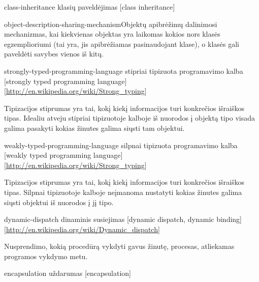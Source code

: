 \begin{glossary}
\begin{entry}
  \end{entry}

  \begin{entry}%
    {class-inheritance}%
    {klasių paveldėjimas}%
    [class inheritance]

    \gls{object-description-sharing-mechanism}{Objektų apibrėžimų
    dalinimosi mechanizmas}, kai kiekvienas objektas yra laikomas
    kokios nors klasės egzemplioriumi (tai yra, jis apibrėžiamas
    pasinaudojant klase), o klasės gali paveldėti savybes vienos
    iš kitų.
    
  \end{entry}

  \begin{entry}%
    {strongly-typed-programming-language}%
    {stipriai tipizuota programavimo kalba}%
    [strongly typed programming language]%
    [\url{http://en.wikipedia.org/wiki/Strong_typing}]

    Tipizacijos stiprumas yra tai, kokį kiekį informacijos turi
    konkrečios išraiškos tipas. Idealiu atveju stipriai tipizuotoje
    kalboje iš nuorodos į objektą tipo visada galima pasakyti kokias
    žinutes galima siųsti tam
    objektui.\cite[1]{Madsen:1990:STO:97946.97964}
    
  \end{entry}

  \begin{entry}%
    {weakly-typed-programming-language}%
    {silpnai tipizuota programavimo kalba}%
    [weakly typed programming language]%
    [\url{http://en.wikipedia.org/wiki/Strong_typing}]

    Tipizacijos stiprumas yra tai, kokį kiekį informacijos turi
    konkrečios išraiškos tipas. Silpnai tipizuotoje kalboje neįmanoma
    nustatyti kokias žinutes galima siųsti objektui iš nuorodos į jį
    tipo.\cite[1]{Madsen:1990:STO:97946.97964}
    
  \end{entry}

  \begin{entry}%
    {dynamic-dispatch}%
    {dinaminis susiejimas}%
    [dynamic dispatch, dynamic binding]%
    [\url{http://en.wikipedia.org/wiki/Dynamic_dispatch}]

    Nusprendimo, kokią procedūrą vykdyti gavus žinutę, procesas,
    atliekamas programos vykdymo metu.
    \cite[225]{types-and-programming-languages}

  \end{entry}

  \begin{entry}%
    {encapsulation}%
    {uždarumas}%
    [encapsulation]


\end{entry}
\end{glossary}
